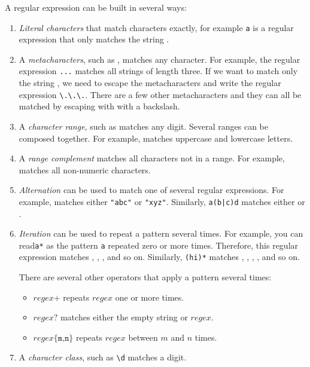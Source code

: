 A regular expression can be built in several ways:

\begin{enumerate}

 \item  \emph{Literal characters} that match characters exactly, for example \texttt{a} is a regular expression that only matches the string .

  \item A \emph{metacharacters}, such as , matches any character. For example, the regular expression \texttt{...} matches all strings of length three. If we want to match only the string , we need to escape the metacharacters and write the regular expression \verb|\.\.\.|. There are a few other metacharacters and they can all be matched by escaping with with a backslash.

  \item A \emph{character range}, such as \scalainline{[0-9]} matches any digit. Several ranges can be composed together. For example, \scalainline{[A-Za-z]} matches uppercase and lowercase letters.

  \item A \emph{range complement} matches all characters not in a range. For example, \scalainline{[^ 0-9]} matches all non-numeric characters.

  \item \emph{Alternation} can be used to match one of several regular expressions. For example,  matches either \texttt{"abc"} or \texttt{"xyz"}. Similarly, \texttt{a(b|c)d} matches either  or .

  \item \emph{Iteration} can be used to repeat a pattern several times. For example, you can read\texttt{a*} as the pattern \texttt{a} repeated zero or more times. Therefore, this regular expression matches , , , and so on. Similarly, \texttt{(hi)*} matches , , , , and so on.

  There are several other operators that apply a pattern several times:

  \begin{itemize}
    \item $\mathit{regex}\texttt{+}$ repeats $\mathit{regex}$ one or more times.
    \item $\mathit{regex}\texttt{?}$ matches either the empty string or $\mathit{regex}$.
        \item $\mathit{regex}\texttt{\{m,n\}}$ repeats $\mathit{regex}$ between $m$ and $n$ times.
  \end{itemize}

  \item A \emph{character class}, such as \verb|\d| matches a digit.

\end{enumerate}

